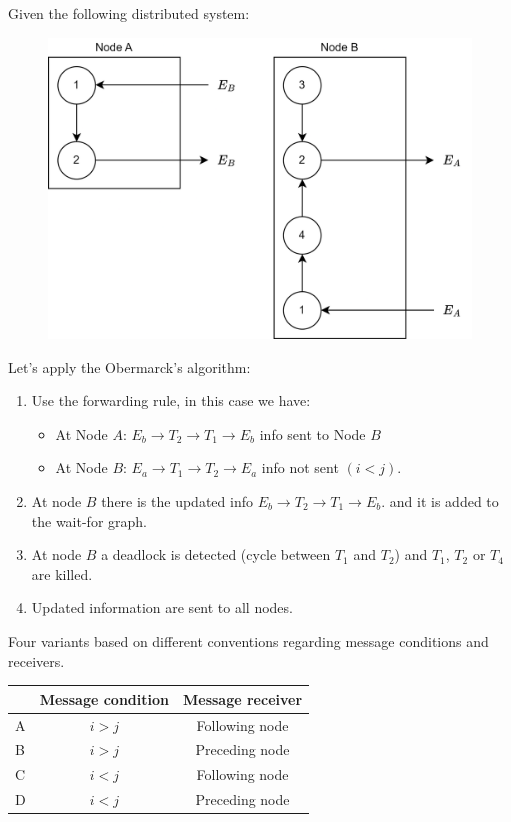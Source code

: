 \begin{example}
    Given the following distributed system:
    \begin{figure}[H]
        \centering
        \includegraphics[width=0.5\linewidth]{images/distributedgraph.png}
    \end{figure}
    Let's apply the Obermarck's algorithm:
    \begin{enumerate}
        \item Use the forwarding rule, in this case we have: 
            \begin{itemize}
                \item At Node $A$: $E_b \rightarrow T_2 \rightarrow T_1 \rightarrow E_b$ info sent to Node $B$
                \item At Node $B$: $E_a \rightarrow T_1 \rightarrow T_2 \rightarrow E_a$ info not sent $(i<j)$. 
            \end{itemize}
        \item At node $B$ there is the updated info $E_b \rightarrow T_2 \rightarrow T_1 \rightarrow E_b$. and it is added to the wait-for graph.
        \item At node $B$ a deadlock is detected (cycle between $T_1$ and $T_2$) and $T_1$, $T_2$ or $T_4$ are killed. 
        \item Updated information are sent to all nodes. 
    \end{enumerate}
\end{example}
Four variants based on different conventions regarding message conditions and receivers.
\begin{table}[H]
    \centering
    \begin{tabular}{c|cc|}
    \cline{2-3}
    \textbf{}               & \textbf{Message condition} & \textbf{Message receiver} \\ \hline
    \multicolumn{1}{|l|}{A} & $i>j$                      & Following node            \\
    \multicolumn{1}{|l|}{B} & $i>j$                      & Preceding node            \\
    \multicolumn{1}{|l|}{C} & $i<j$                      & Following node            \\
    \multicolumn{1}{|l|}{D} & $i<j$                      & Preceding node            \\ \hline
    \end{tabular}
\end{table}

